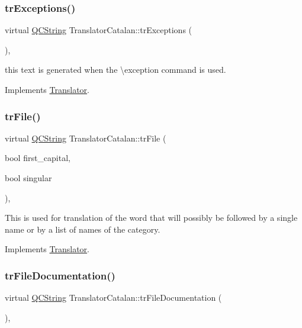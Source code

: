 \subsubsection{\texorpdfstring{trExceptions()}{trExceptions()}}
{\footnotesize\ttfamily virtual \mbox{\hyperlink{class_q_c_string}{Q\+C\+String}} Translator\+Catalan\+::tr\+Exceptions (\begin{DoxyParamCaption}{ }\end{DoxyParamCaption})\hspace{0.3cm}{\ttfamily [inline]}, {\ttfamily [virtual]}}

this text is generated when the \textbackslash{}exception command is used. 

Implements \mbox{\hyperlink{class_translator}{Translator}}.

\mbox{\label{class_translator_catalan_a470b277d4905f3e16a27ba10cd095e15}} 
\subsubsection{\texorpdfstring{trFile()}{trFile()}}
{\footnotesize\ttfamily virtual \mbox{\hyperlink{class_q_c_string}{Q\+C\+String}} Translator\+Catalan\+::tr\+File (\begin{DoxyParamCaption}\item[{bool}]{first\+\_\+capital,  }\item[{bool}]{singular }\end{DoxyParamCaption})\hspace{0.3cm}{\ttfamily [inline]}, {\ttfamily [virtual]}}

This is used for translation of the word that will possibly be followed by a single name or by a list of names of the category. 

Implements \mbox{\hyperlink{class_translator}{Translator}}.

\mbox{\label{class_translator_catalan_ae339a7a6be4de49674a8a1dbb998c834}} 
\subsubsection{\texorpdfstring{trFileDocumentation()}{trFileDocumentation()}}
{\footnotesize\ttfamily virtual \mbox{\hyperlink{class_q_c_string}{Q\+C\+String}} Translator\+Catalan\+::tr\+File\+Documentation (\begin{DoxyParamCaption}{ }\end{DoxyParamCaption})\hspace{0.3cm}{\ttfamily [inline]}, {\ttfamily [virtual]}}

